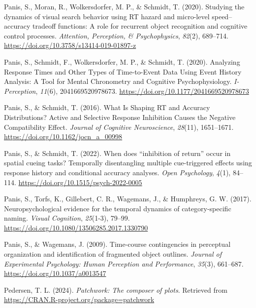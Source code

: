 \documentclass[
  man,floatsintext]{apa6}
\newlength{\cslhangindent}
\newenvironment{CSLReferences}[2] %
 {\begin{list}{}{%
  \setlength{\itemindent}{0pt}
  \setlength{\leftmargin}{0pt}
  \setlength{\parsep}{0pt}
  \ifodd #1
   \setlength{\leftmargin}{\cslhangindent}
   \setlength{\itemindent}{-1\cslhangindent}
  \fi
  \setlength{\itemsep}{#2\baselineskip}}}
 {\end{list}}
\begin{document}
\begin{CSLReferences}{1}{0}
Panis, S., Moran, R., Wolkersdorfer, M. P., \& Schmidt, T. (2020). Studying the dynamics of visual search behavior using {RT} hazard and micro-level speed--accuracy tradeoff functions: {A} role for recurrent object recognition and cognitive control processes. \emph{Attention, Perception, \& Psychophysics}, \emph{82}(2), 689--714. \url{https://doi.org/10.3758/s13414-019-01897-z}

Panis, S., Schmidt, F., Wolkersdorfer, M. P., \& Schmidt, T. (2020). Analyzing {Response Times} and {Other Types} of {Time-to-Event Data Using Event History Analysis}: {A Tool} for {Mental Chronometry} and {Cognitive Psychophysiology}. \emph{I-Perception}, \emph{11}(6), 2041669520978673. \url{https://doi.org/10.1177/2041669520978673}

Panis, S., \& Schmidt, T. (2016). What {Is Shaping RT} and {Accuracy Distributions}? {Active} and {Selective Response Inhibition Causes} the {Negative Compatibility Effect}. \emph{Journal of Cognitive Neuroscience}, \emph{28}(11), 1651--1671. \url{https://doi.org/10.1162/jocn_a_00998}

Panis, S., \& Schmidt, T. (2022). When does {``inhibition of return''} occur in spatial cueing tasks? {Temporally} disentangling multiple cue-triggered effects using response history and conditional accuracy analyses. \emph{Open Psychology}, \emph{4}(1), 84--114. \url{https://doi.org/10.1515/psych-2022-0005}

Panis, S., Torfs, K., Gillebert, C. R., Wagemans, J., \& Humphreys, G. W. (2017). Neuropsychological evidence for the temporal dynamics of category-specific naming. \emph{Visual Cognition}, \emph{25}(1-3), 79--99. \url{https://doi.org/10.1080/13506285.2017.1330790}

Panis, S., \& Wagemans, J. (2009). Time-course contingencies in perceptual organization and identification of fragmented object outlines. \emph{Journal of Experimental Psychology: Human Perception and Performance}, \emph{35}(3), 661--687. \url{https://doi.org/10.1037/a0013547}

Pedersen, T. L. (2024). \emph{Patchwork: The composer of plots}. Retrieved from \url{https://CRAN.R-project.org/package=patchwork}


\end{CSLReferences}
\end{document}
